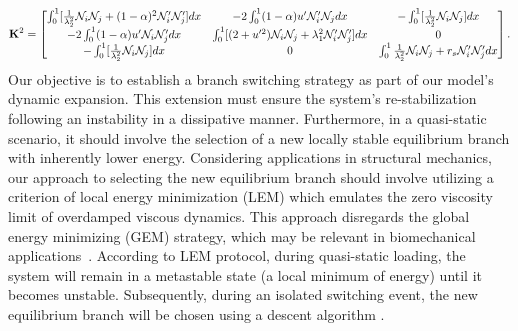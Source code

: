 \begin{equation}
{\bf K}^2=\begin{bmatrix}
\int_0^1[ \frac{1}{\lambda_2^2}{\mathcal N}_i{\mathcal N}_j + (1-\alpha)^2{\mathcal N}'_i{\mathcal N}'_j] dx&
-2\int_0^1(1-\alpha)u' {\mathcal N}'_i {\mathcal N}_j  dx&
-\int_0^1[\frac{1}{\lambda_2^2}{\mathcal N}_i {\mathcal N}_j]  dx\\

-2\int_0^1(1-\alpha)u' {\mathcal N}_i {\mathcal N}'_j dx&
 \int_0^1 [ (2+u'^2){\mathcal N}_i{\mathcal N}_j +\lambda_1^2{\mathcal N}'_i{\mathcal N}'_j] dx&
 0\\

-\int_0^1[\frac{1}{\lambda_2^2}{\mathcal N}_i{\mathcal N}_j ] dx
&0
&\int_0^1\frac{1}{\lambda_2^2}{\mathcal N}_i {\mathcal N}_j+r_s{\mathcal N}'_i {\mathcal N}'_j  dx
\end{bmatrix}.
\label{eq:stifness2}
\end{equation}
Our objective is to establish a branch switching strategy as part of our model's dynamic expansion. This extension must ensure the system's re-stabilization following an instability in a dissipative manner. Furthermore, in a quasi-static scenario, it should involve the selection of a new locally stable equilibrium branch with inherently lower energy.  Considering applications in structural mechanics, our approach to selecting the new equilibrium branch should involve utilizing a criterion of local energy minimization (LEM)  which emulates the zero viscosity limit of overdamped viscous dynamics. This approach disregards the global energy minimizing (GEM) strategy, which may be relevant in biomechanical applications~\cite{Salman2021-mn}. According to LEM protocol, during quasi-static loading, the system will remain in a metastable state (a local minimum of energy) until it becomes unstable. Subsequently, during an isolated switching event, the new equilibrium branch will be chosen using a descent algorithm \cite{Puglisi2005-lg}.
